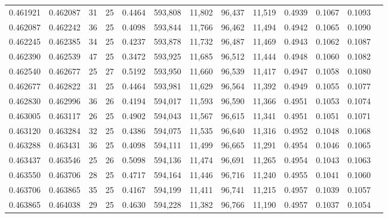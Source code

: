 \begin{tabular}{rrrrrrrrrrrrr}
0.461921 & 0.462087 &    31 &  25 &                                     0.4464 & 593,808 &  11,802 &  96,437 &  11,519 & 0.4939 & 0.1067 & 0.1093 \\
0.462087 & 0.462242 &    36 &  25 &                                     0.4098 & 593,844 &  11,766 &  96,462 &  11,494 & 0.4942 & 0.1065 & 0.1090 \\
0.462245 & 0.462385 &    34 &  25 &                                     0.4237 & 593,878 &  11,732 &  96,487 &  11,469 & 0.4943 & 0.1062 & 0.1087 \\
0.462390 & 0.462539 &    47 &  25 &                                     0.3472 & 593,925 &  11,685 &  96,512 &  11,444 & 0.4948 & 0.1060 & 0.1082 \\
0.462540 & 0.462677 &    25 &  27 &                                     0.5192 & 593,950 &  11,660 &  96,539 &  11,417 & 0.4947 & 0.1058 & 0.1080 \\
0.462677 & 0.462822 &    31 &  25 &                                     0.4464 & 593,981 &  11,629 &  96,564 &  11,392 & 0.4949 & 0.1055 & 0.1077 \\
0.462830 & 0.462996 &    36 &  26 &                                     0.4194 & 594,017 &  11,593 &  96,590 &  11,366 & 0.4951 & 0.1053 & 0.1074 \\
0.463005 & 0.463117 &    26 &  25 &                                     0.4902 & 594,043 &  11,567 &  96,615 &  11,341 & 0.4951 & 0.1051 & 0.1071 \\
0.463120 & 0.463284 &    32 &  25 &                                     0.4386 & 594,075 &  11,535 &  96,640 &  11,316 & 0.4952 & 0.1048 & 0.1068 \\
0.463288 & 0.463431 &    36 &  25 &                                     0.4098 & 594,111 &  11,499 &  96,665 &  11,291 & 0.4954 & 0.1046 & 0.1065 \\
0.463437 & 0.463546 &    25 &  26 &                                     0.5098 & 594,136 &  11,474 &  96,691 &  11,265 & 0.4954 & 0.1043 & 0.1063 \\
0.463550 & 0.463706 &    28 &  25 &                                     0.4717 & 594,164 &  11,446 &  96,716 &  11,240 & 0.4955 & 0.1041 & 0.1060 \\
0.463706 & 0.463865 &    35 &  25 &                                     0.4167 & 594,199 &  11,411 &  96,741 &  11,215 & 0.4957 & 0.1039 & 0.1057 \\
0.463865 & 0.464038 &    29 &  25 &                                     0.4630 & 594,228 &  11,382 &  96,766 &  11,190 & 0.4957 & 0.1037 & 0.1054 \\

\end{tabular}
